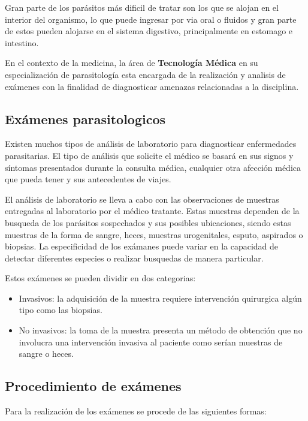 \documentclass[letter,12pt]{report}
\begin{document}
Gran parte de los parásitos más dificil de tratar son los que se alojan en el
interior del organismo, lo que puede ingresar por via oral o fluidos y gran parte de
estos pueden alojarse en el sistema digestivo, principalmente en estomago e
intestino.

En el contexto de la medicina, la área de \textbf{Tecnología Médica} en su
especialización de parasitología esta encargada de la realización y analisis de
exámenes con la finalidad de diagnosticar amenazas relacionadas a la disciplina.

\subsection{Exámenes parasitologicos}

Existen muchos tipos de análisis de laboratorio para diagnosticar enfermedades parasitarias.
El tipo de análisis que solicite el médico se basará en sus signos y síntomas presentados
durante la consulta médica, cualquier otra afección médica que pueda tener y sus
antecedentes de viajes.

El análisis de laboratorio se lleva a cabo con las observaciones de muestras entregadas
al laboratorio por el médico tratante. Estas muestras dependen de la busqueda de los
parásitos sospechados y sus posibles ubicaciones, siendo estas muestras de la forma de
sangre, heces, muestras urogenitales, esputo, aspirados o biopsias. La especificidad de
los exámanes puede variar en la capacidad de detectar diferentes especies o realizar
busquedas de manera particular.

Estos exámenes se pueden dividir en dos categorias:

\begin{itemize}
    \item Invasivos: la adquisición de la muestra requiere intervención
        quirurgica algún tipo como las biopsias.
    \item No invasivos: la toma de la muestra presenta un método de obtención que no
        involucra una intervención invasiva al paciente como serían muestras de sangre o
        heces.
\end{itemize}

\subsection{Procedimiento de exámenes}

Para la realización de los exámenes se procede de las siguientes formas: %
\end{document}
